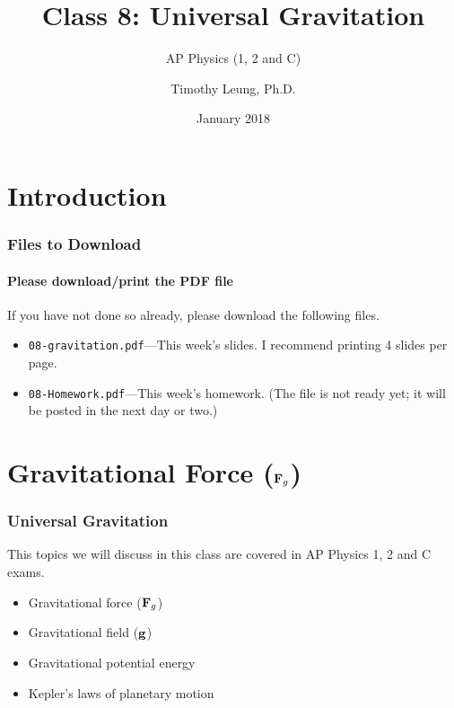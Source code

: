 \documentclass[12pt,compress,aspectratio=169]{beamer}
\title{Class 8: Universal Gravitation}
\subtitle{AP Physics (1, 2 and C)}
\author[TML]{Timothy Leung, Ph.D.}
\institute{Olympiads School}
\date{January 2018}
\newcommand{\mb}[1]{\ensuremath\mathbf{#1}}
\begin{document}
\begin{frame}
  \maketitle
\end{frame}


\section[Intro]{Introduction}

\begin{frame}
  \frametitle{Files to Download}
  \framesubtitle{Please download/print the PDF file}
  If you have not done so already, please download the following files.
  \begin{itemize}
  \item\texttt{08-gravitation.pdf}---This week's
    slides. I recommend printing 4 slides per page.
  \item\texttt{08-Homework.pdf}---This week's homework. (The file is not ready
    yet; it will be posted in the next day or two.)
  \end{itemize}
\end{frame}





\section[$\mb{F}_g$]{Gravitational Force ($\mb{F}_g$)}
\begin{frame}
  \frametitle{Universal Gravitation}
  This topics we will discuss in this class are covered in AP Physics 1, 2 and
  C exams.
  \begin{itemize}
  \item Gravitational force ($\mb{F}_g$)
  \item Gravitational field ($\mb{g}$)
  \item Gravitational potential energy
  \item Kepler's laws of planetary motion
  \end{itemize}
\end{frame}
\end{document}
